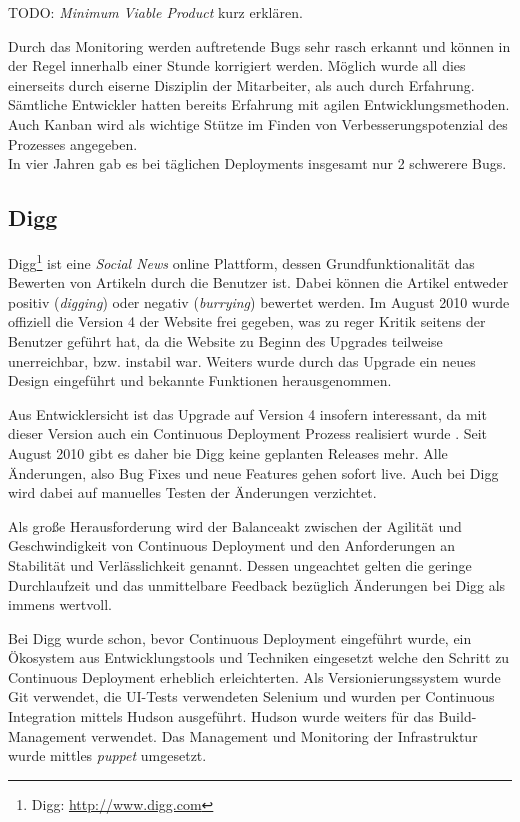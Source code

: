 \begin{wichtigbox}
TODO: \emph{Minimum Viable Product} kurz erklären.
\end{wichtigbox}

Durch das Monitoring werden auftretende Bugs sehr rasch erkannt und können  in
der Regel innerhalb einer Stunde korrigiert werden. Möglich wurde all dies
einerseits durch eiserne Disziplin der Mitarbeiter, als auch durch Erfahrung.
Sämtliche Entwickler hatten bereits Erfahrung mit agilen Entwicklungsmethoden.
Auch Kanban wird als wichtige Stütze im Finden von Verbesserungspotenzial des
Prozesses angegeben.\\
In vier Jahren gab es bei täglichen Deployments insgesamt nur 2 schwerere
Bugs.


\subsection{Digg}

Digg\footnote{Digg: \url{http://www.digg.com}} ist eine \emph{Social News}
online Plattform, dessen Grundfunktionalität das Bewerten von Artikeln durch
die Benutzer ist. Dabei können die Artikel entweder positiv (\emph{digging})
oder negativ (\emph{burrying}) bewertet werden. Im August 2010 wurde offiziell
die Version 4 der Website frei gegeben, was zu reger Kritik seitens der
Benutzer geführt hat, da die Website zu Beginn des Upgrades teilweise
unerreichbar, bzw. instabil war. Weiters wurde durch das Upgrade ein neues
Design eingeführt und bekannte Funktionen herausgenommen.

Aus Entwicklersicht ist das Upgrade auf Version 4 insofern interessant, da mit
dieser Version auch ein Continuous Deployment Prozess realisiert wurde
\cite{digg4}. Seit August 2010 gibt es daher bie Digg keine geplanten Releases
mehr. Alle Änderungen, also Bug Fixes und neue Features gehen sofort live.
Auch bei Digg wird dabei auf manuelles Testen der Änderungen verzichtet.

Als große Herausforderung wird der Balanceakt zwischen der Agilität und
Geschwindigkeit von Continuous Deployment und den Anforderungen an Stabilität
und Verlässlichkeit genannt. Dessen ungeachtet gelten die geringe
Durchlaufzeit und das unmittelbare Feedback bezüglich Änderungen bei Digg als
immens wertvoll.

 Bei Digg wurde schon, bevor Continuous Deployment
eingeführt wurde, ein Ökosystem aus Entwicklungstools und Techniken eingesetzt
welche den Schritt zu Continuous Deployment erheblich erleichterten. Als
Versionierungssystem wurde Git verwendet, die UI-Tests verwendeten Selenium
und wurden per Continuous Integration mittels Hudson ausgeführt. Hudson wurde
weiters für das Build-Management verwendet. Das Management und Monitoring der
Infrastruktur wurde mittles \emph{puppet} umgesetzt.

